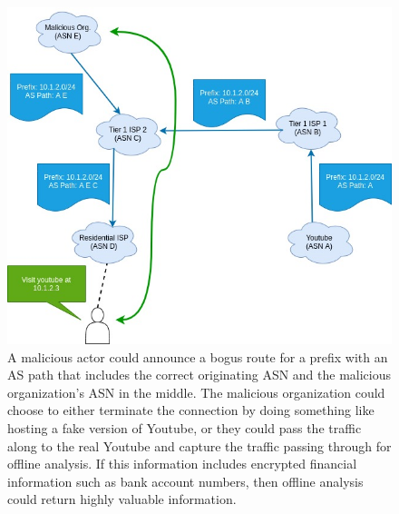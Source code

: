 \documentclass[conference]{IEEEtran}
\begin{document}
\begin{figure}[hp]
  \includegraphics[width=\linewidth]{images/bgp-intercept.jpg}
  \caption{A malicious actor could announce a bogus route for a prefix with an AS path that includes the correct originating ASN and the malicious organization's ASN in the middle.  The malicious organization could choose to either terminate the connection by doing something like hosting a fake version of Youtube, or they could pass the traffic along to the real Youtube and capture the traffic passing through for offline analysis.  If this information includes encrypted financial information such as bank account numbers, then offline analysis could return highly valuable information.}
  \label{fig:bgp-intercept}
\end{figure}
\end{document}
